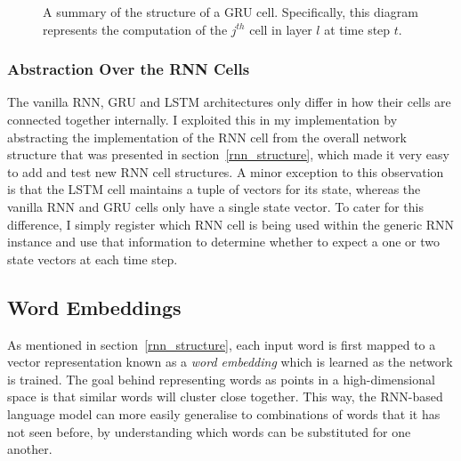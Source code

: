\documentclass[a4paper, 12pt]{report}
\newcommand{\tit}[1]{\textit{#1}}
\begin{document}
\begin{figure}[h]
\caption{A summary of the structure of a GRU cell. Specifically, this diagram represents the computation of the $j^{th}$ cell in layer $l$ at time step $t$.}
\label{fig:gru_structure}
\end{figure}

\subsubsection{Abstraction Over the RNN Cells}

The vanilla RNN, GRU and LSTM architectures only differ in how their cells are connected together internally. I exploited this in my implementation by abstracting the implementation of the RNN cell from the overall network structure that was presented in section~\ref{rnn_structure}, which made it very easy to add and test new RNN cell structures. A minor exception to this observation is that the LSTM cell maintains a tuple of vectors for its state, whereas the vanilla RNN and GRU cells only have a single state vector. To cater for this difference, I simply register which RNN cell is being used within the generic RNN instance and use that information to determine whether to expect a one or two state vectors at each time step.

\subsection{Word Embeddings} \label{embeddings}

As mentioned in section~\ref{rnn_structure}, each input word is first mapped to a vector representation known as a \tit{word embedding} which is learned as the network is trained. The goal behind representing words as points in a high-dimensional space is that similar words will cluster close together. This way, the RNN-based language model can more easily generalise to combinations of words that it has not seen before, by understanding which words can be substituted for one another. \\
\end{document}
